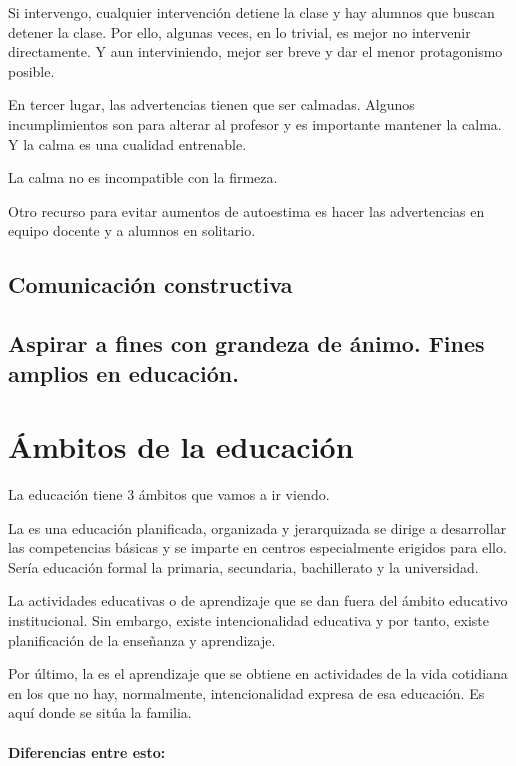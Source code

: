 \documentclass[palatino]{apuntesURJC}
\begin{document}
Si intervengo, cualquier intervención detiene la clase y hay alumnos que buscan detener la clase. 
%
Por ello, algunas veces, en lo trivial, es mejor no intervenir directamente.
%
Y aun interviniendo, mejor ser breve y dar el menor protagonismo posible.

En tercer lugar, las advertencias tienen que ser calmadas. 
%
Algunos incumplimientos son para alterar al profesor y es importante mantener la calma. 
%
Y la calma es una cualidad entrenable.

La calma no es incompatible con la firmeza.

Otro recurso para evitar aumentos de autoestima es hacer las advertencias en equipo docente y a alumnos en solitario.



\subsection{Comunicación constructiva}

\subsection{Aspirar a fines con grandeza de ánimo. Fines amplios en educación.}


\section{Ámbitos de la educación}

La educación tiene 3 ámbitos que vamos a ir viendo.

La  es una educación planificada, organizada y jerarquizada se dirige a desarrollar las competencias básicas y se imparte en centros especialmente erigidos para ello.
%
Sería educación formal la primaria, secundaria, bachillerato y la universidad.

La  actividades educativas o de aprendizaje que se dan fuera del ámbito educativo institucional. 
%
Sin embargo, existe intencionalidad educativa y por tanto, existe planificación de la enseñanza y aprendizaje.

Por último, la  es el aprendizaje que se obtiene en actividades de la vida cotidiana en los que no hay, normalmente, intencionalidad expresa de esa educación.
%
Es aquí donde se sitúa la familia.

\paragraph{Diferencias entre esto:}
\end{document}
